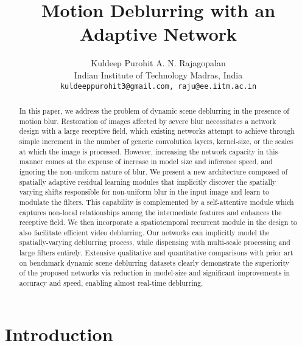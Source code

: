 \documentclass[10pt,twocolumn,letterpaper]{article}
\begin{document}
\title{Motion Deblurring with an Adaptive Network}

\author{Kuldeep Purohit \qquad A. N. Rajagopalan \\
 Indian Institute of Technology Madras, India 
\\
{\tt\small kuldeeppurohit3@gmail.com, raju@ee.iitm.ac.in}
} 

\maketitle



\begin{abstract}
 
In this paper, we address
the problem of dynamic scene deblurring in the presence
of motion blur. Restoration of images affected by severe
blur necessitates a network design with a large receptive field,
which existing networks attempt to achieve through simple increment in the
number of generic convolution layers, kernel-size, or the
scales at which the image is processed. However, increasing the network capacity in this manner comes at the expense
of increase in model size and inference speed, and ignoring
the non-uniform nature of blur. We present a new architecture composed of spatially adaptive residual learning modules that implicitly discover the spatially varying shifts responsible for non-uniform blur in the input image and learn to modulate the filters. This capability is complemented by a self-attentive module which captures non-local relationships among the intermediate features and enhances the receptive field. We then incorporate a spatiotemporal recurrent module in the design to also facilitate efficient video deblurring. Our networks can implicitly model the spatially-varying deblurring process, while dispensing with multi-scale processing
and large filters entirely. Extensive qualitative and quantitative comparisons with prior art on benchmark dynamic
scene deblurring datasets clearly demonstrate the superiority of the proposed networks via reduction in model-size and
significant improvements in accuracy and speed, enabling almost real-time deblurring. 
\end{abstract}

\section{Introduction}
\end{document}
